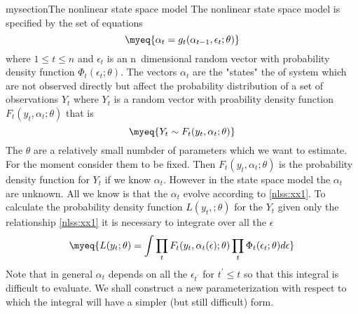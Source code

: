mysection{The nonlinear state space model}
The nonlinear state space model is specified by the set of equations
\begin{equation}
 \myeq{\alpha_t=g_t(\alpha_{t-1},\epsilon_t;\theta)}\label{nlss:xx1}
\end{equation}
where $1\le t\le n$ and $\epsilon_t$
is an n~dimensional  random vector with probability density function
$\Phi_t(\epsilon_t;\theta)$. 
The vectors $\alpha_t$ are the "states" the of system
which are not observed directly but affect the
probability distribution of a set of observations
$Y_t$ where  $Y_t$ is a random vector with
proability density function $F_t(y_t,\alpha_t;\theta)$ that is
\begin{equation}
 \myeq{Y_t \sim F_t(y_t,\alpha_t;\theta)}\label{nlss:xx1a}
\end{equation}
The $\theta$ are a relatively small numbder of parameters
which we want to estimate. For the moment consider them to be fixed.
Then $F_t(y_t,\alpha_t;\theta)$ is the probability density 
function for $Y_t$ if we know $\alpha_t$. However in the state space model
the $\alpha_t$ are unknown. All we know is that the $\alpha_t$ evolve 
according to \ref{nlss:xx1}.
 To calculate the probability density
function $L(y_t,;\theta)$ for the $Y_t$ given only the 
 relationship \ref{nlss:xx1}
it is necessary to integrate over all the $\epsilon$
\begin{equation}
 \myeq{L(y_t;\theta)=\int \prod_t F_t(y_t,\alpha_t(\epsilon);\theta)\prod_t \Phi_t(\epsilon_t;\theta) d\epsilon}
\end{equation}
Note that in general $\alpha_t$ depends on all the $\epsilon_{t^\prime}$
for $t^\prime\le t$ so that this integral is difficult to evaluate. 
We shall construct a new parameterization with respect to which the
integral will have a simpler (but still difficult) form. 

